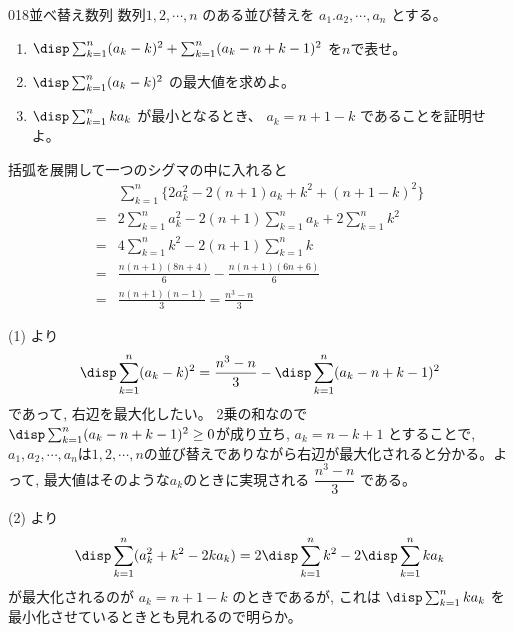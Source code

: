 \begin{prob}{018}{}{並べ替え数列}
 数列$1,2,\cdots, n$ のある並び替えを $a_1.a_2,\cdots , a_n$ とする。\\
 \begin{enumerate}
  \item $\disp \sum_{k=1}^n(a_k-k)^2+\sum^n_{k=1}(a_k-n+k-1)^2$ を$n$で表せ。
  \item $\disp \sum_{k=1}^n(a_k-k)^2$ の最大値を求めよ。
  \item $\disp \sum_{k=1}^nka_k$ が最小となるとき、 $a_k=n+1-k$ であることを証明せよ。
 \end{enumerate}
\end{prob}
括弧を展開して一つのシグマの中に入れると 
\begin{align*}
&\sum_{k=1}^n \{2a_k^2-2(n+1)a_k + k^2 + (n+1-k)^2 \}\\
=& 2\sum_{k=1}^na_k^2 -2(n+1)\sum_{k=1}^na_k + 2\sum_{k=1}^n k^2\\
=& 4\sum_{k=1}^nk^2 - 2(n+1)\sum_{k=1}^nk\\
=& \frac{n(n+1)(8n+4)}{6} - \frac{n(n+1)(6n+6)}{6}\\
=& \frac{n(n+1)(n-1)}{3}=\frac{n^3-n}{3}
\end{align*}

(1) より
\[\disp\sum_{k=1}^n(a_k-k)^2 = \dfrac{n^3-n}{3}-\disp\sum_{k=1}^n (a_k-n+k-1)^2\]
であって, 右辺を最大化したい。 2乗の和なので$\disp\sum_{k=1}^n (a_k-n+k-1)^2\geq 0$が成り立ち, $a_k=n-k+1$ とすることで, $a_1,a_2,\cdots, a_n$は$1,2,\cdots ,n$の並び替えでありながら右辺が最大化されると分かる。よって, 最大値はそのような$a_k$のときに実現される $\dfrac{n^3-n}{3}$ である。

(2) より
\[ \disp\sum_{k=1}^n (a_k^2+k^2 -2ka_k)=2\disp\sum_{k=1}^n k^2 -2\disp\sum_{k=1}^n ka_k\]
が最大化されるのが $a_k=n+1-k$ のときであるが, これは $\disp\sum_{k=1}^n ka_k$ を最小化させているときとも見れるので明らか。

